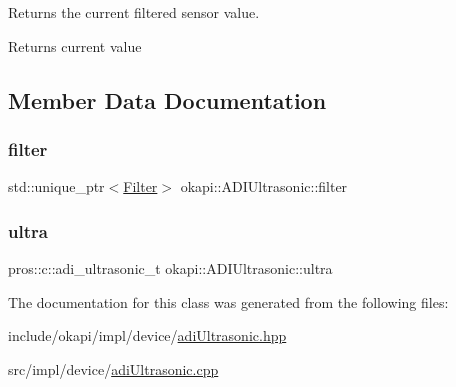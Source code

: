 Returns the current filtered sensor value.

\begin{DoxyReturn}{Returns}
current value 
\end{DoxyReturn}


\subsection{Member Data Documentation}
\mbox{\label{classokapi_1_1ADIUltrasonic_aa2537c5ffc44d18838b0710af72bf338}} 
\subsubsection{\texorpdfstring{filter}{filter}}
{\footnotesize\ttfamily std\+::unique\+\_\+ptr$<$\mbox{\hyperlink{classokapi_1_1Filter}{Filter}}$>$ okapi\+::\+A\+D\+I\+Ultrasonic\+::filter\hspace{0.3cm}{\ttfamily [protected]}}

\mbox{\label{classokapi_1_1ADIUltrasonic_ac952316de8cf081e260e8da689dbc66f}} 
\subsubsection{\texorpdfstring{ultra}{ultra}}
{\footnotesize\ttfamily pros\+::c\+::adi\+\_\+ultrasonic\+\_\+t okapi\+::\+A\+D\+I\+Ultrasonic\+::ultra\hspace{0.3cm}{\ttfamily [protected]}}



The documentation for this class was generated from the following files\+:\begin{DoxyCompactItemize}
\item 
include/okapi/impl/device/\mbox{\hyperlink{adiUltrasonic_8hpp}{adi\+Ultrasonic.\+hpp}}\item 
src/impl/device/\mbox{\hyperlink{adiUltrasonic_8cpp}{adi\+Ultrasonic.\+cpp}}\end{DoxyCompactItemize}
